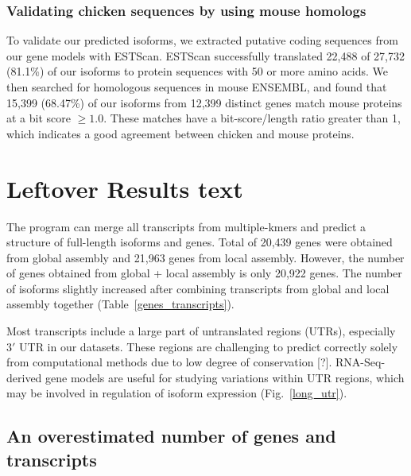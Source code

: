 \documentclass[10pt]{article}
\begin{document}

\subsubsection*{Validating chicken sequences by using mouse homologs}

To validate our predicted isoforms, we extracted putative coding sequences from
our gene models with ESTScan\cite{Iseli:1999vd}.  ESTScan
successfully translated 22,488 of 27,732 (81.1\%) of our isoforms to
protein sequences with 50 or more amino acids.  We then searched for
homologous sequences in mouse ENSEMBL, and found that 15,399 (68.47\%)
of our isoforms from 12,399 distinct genes match mouse proteins at a
bit score $\ge1.0$.
These matches have a bit-score/length ratio greater than 1,
which indicates a good agreement between chicken and mouse proteins.


\section*{Leftover Results text}

The program can merge all transcripts from multiple-kmers and predict
a structure of full-length isoforms and genes.
Total of 20,439 genes were obtained from global assembly and 21,963 genes
from local assembly.
However, the number of genes obtained from global + local assembly is only 20,922 genes.
The number of isoforms slightly increased after combining
transcripts from global and local assembly together (Table~\ref{genes_transcripts}). 

Most transcripts include a large part of untranslated regions (UTRs), especially $3'$ UTR in our datasets.
These regions are challenging to predict correctly solely from computational methods due to low degree of conservation [?].
RNA-Seq-derived gene models are useful for studying variations within UTR regions, which may be involved in regulation of isoform expression\cite{} (Fig.~\ref{long_utr}).

\subsection*{An overestimated number of genes and transcripts}
\end{document}
